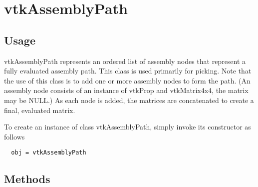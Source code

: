 \section{vtkAssemblyPath}

\subsection{Usage}

 vtkAssemblyPath represents an ordered list of assembly nodes that
 represent a fully evaluated assembly path. This class is used primarily
 for picking. Note that the use of this class is to add one or more
 assembly nodes to form the path. (An assembly node consists of an instance
 of vtkProp and vtkMatrix4x4, the matrix may be NULL.) As each node is
 added, the matrices are concatenated to create a final, evaluated matrix.

To create an instance of class vtkAssemblyPath, simply
invoke its constructor as follows
\begin{verbatim}
  obj = vtkAssemblyPath
\end{verbatim}
\subsection{Methods}

